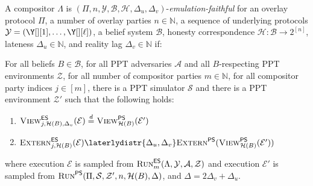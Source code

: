 \begin{definition}\label{def:emulation-faithfulness}
  A compositor $\Lambda$
  is $(\Pi,\allowbreak n,\allowbreak \mathcal{Y},\allowbreak \mathcal{B},\allowbreak \mathcal{H},\allowbreak \Delta_u,\allowbreak \Delta_v)$-\emph{emulation-faithful}
  for an overlay protocol $\Pi$,
  a number of overlay parties $n \in \mathbb{N}$,
  a sequence of underlying protocols $\mathcal{Y} = (\Y[][1], \ldots, \Y[][\ell])$,
  a belief system $\mathcal{B}$,
  honesty correspondence $\mathcal{H}: \mathcal{B} \longrightarrow 2^{[n]}$,
  lateness $\Delta_u \in \mathbb{N}$,
  and reality lag $\Delta_v \in \mathbb{N}$
  if:

  For all beliefs $B \in \mathcal{B}$,
  for all PPT adversaries $\mathcal{A}$ and all
  $B$-respecting PPT environments $\mathcal{Z}$,
  for all number of compositor parties $m \in \mathbb{N}$,
  for all compositor party indices $j \in [m]$,
  there is a PPT simulator $\mathcal{S}$ and there is a
  PPT environment $\mathcal{Z}'$ such that
  the following holds:

  \begin{enumerate}
    \item $\LCView_{j,\mathcal{H}(B),\Delta_v}(\mathcal{E}) \distreq \PEView_{\mathcal{H}(B)}(\mathcal{E}')$
    \item $\LCExtern_{j,\mathcal{H}(B)}(\mathcal{E}) \laterlydistr{\Delta_u,\Delta_v} \PEExtern(\PEView_{\mathcal{H}(B)}(\mathcal{E}'))$
  \end{enumerate}

  where execution $\mathcal{E}$ is sampled from
  $\textsc{Run}^{\textsf{ES}}_m(\Lambda, \mathcal{Y}, \mathcal{A}, \mathcal{Z})$
  and execution $\mathcal{E}'$ is sampled from
  $\textsc{Run}^{\textsf{PS}}(\Pi, \mathcal{S}, \mathcal{Z}', n, \mathcal{H}(B), \Delta)$,
  and $\Delta = 2 \Delta_v + \Delta_u$.
\end{definition}



